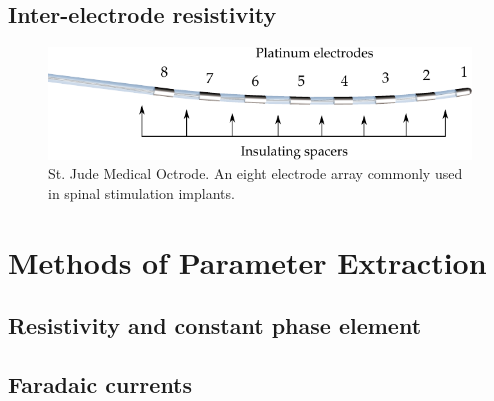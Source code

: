   \subsection{Inter-electrode resistivity}
    \begin{figure}
      \centering
      \includegraphics{content/pt2/07-InterfaceModel/graphics/StJudeOctrodeDiagram}
      \caption{\label{fig:StJudeOctrode_Labelled}St. Jude Medical Octrode. An eight electrode array commonly used in spinal stimulation implants.}
    \end{figure}




\section{Methods of Parameter Extraction}
  \subsection{Resistivity and constant phase element}
  \subsection{Faradaic currents}

